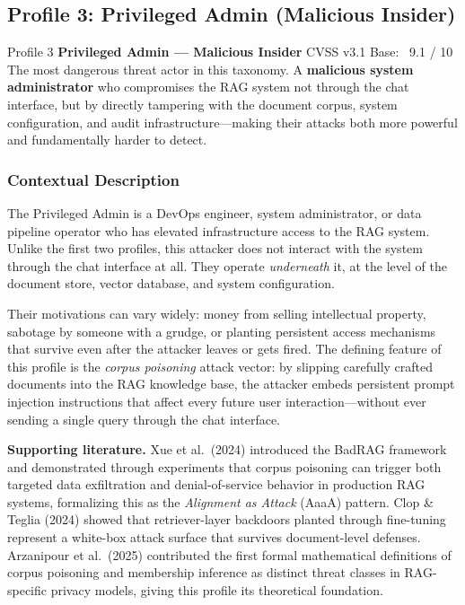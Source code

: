 \newpage
\subsection{Profile 3: Privileged Admin (Malicious Insider)}

\begin{profilebanner}%
  {Profile 3 \enspace\textbf{Privileged Admin --- Malicious Insider}}%
  {CVSS v3.1 Base: \badgecritical\ 9.1 / 10}
  \small
  The most dangerous threat actor in this taxonomy. A \textbf{malicious
  system administrator} who compromises the RAG system not through the
  chat interface, but by directly tampering with the document corpus,
  system configuration, and audit infrastructure---making their attacks
  both more powerful and fundamentally harder to detect.
\end{profilebanner}

\subsubsection{Contextual Description}

\begin{prosebox}
The Privileged Admin is a DevOps engineer, system administrator, or data
pipeline operator who has elevated infrastructure access to the RAG system.
Unlike the first two profiles, this attacker does not interact with the
system through the chat interface at all. They operate \emph{underneath}
it, at the level of the document store, vector database, and system
configuration.

Their motivations can vary widely: money from selling intellectual property,
sabotage by someone with a grudge, or planting persistent access mechanisms
that survive even after the attacker leaves or gets fired.
The defining feature of this profile is the \emph{corpus poisoning} attack
vector: by slipping carefully crafted documents into the RAG knowledge base,
the attacker embeds persistent prompt injection instructions that affect
every future user interaction---without ever sending a single query through
the chat interface.

\medskip
\textbf{Supporting literature.}
Xue et al.\ (2024) introduced the BadRAG framework and demonstrated through
experiments that corpus poisoning can trigger both targeted data exfiltration
and denial-of-service behavior in production RAG systems, formalizing this as
the \emph{Alignment as Attack} (AaaA) pattern. Clop \& Teglia (2024)
showed that retriever-layer backdoors planted through fine-tuning represent
a white-box attack surface that survives document-level defenses.
Arzanipour et al.\ (2025) contributed the first formal mathematical
definitions of corpus poisoning and membership inference as distinct threat
classes in RAG-specific privacy models, giving this profile its theoretical
foundation.
\end{prosebox}

